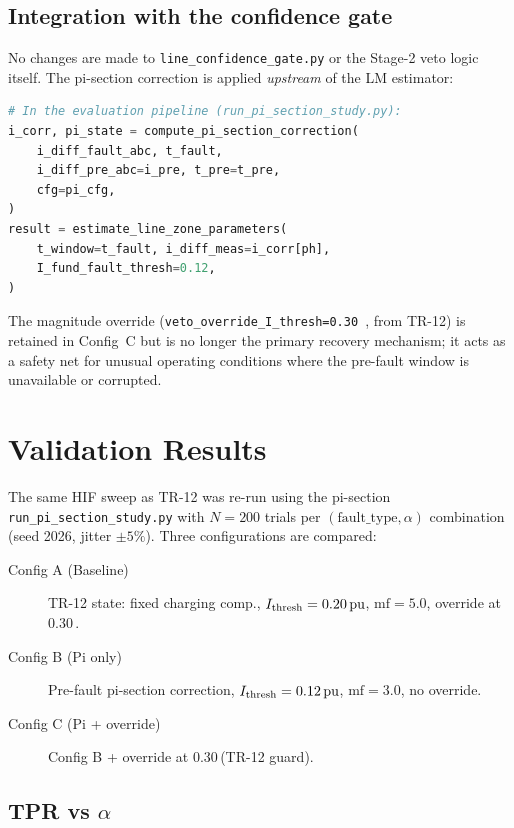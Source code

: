 \documentclass[11pt,a4paper]{article}
\newcommand{\pu}{\,\text{pu}}
\begin{document}
\subsection{Integration with the confidence gate}

No changes are made to \texttt{line\_confidence\_gate.py} or the Stage-2 veto
logic itself.  The pi-section correction is applied \emph{upstream} of the LM
estimator:

\begin{lstlisting}[language=Python]
# In the evaluation pipeline (run_pi_section_study.py):
i_corr, pi_state = compute_pi_section_correction(
    i_diff_fault_abc, t_fault,
    i_diff_pre_abc=i_pre, t_pre=t_pre,
    cfg=pi_cfg,
)
result = estimate_line_zone_parameters(
    t_window=t_fault, i_diff_meas=i_corr[ph],
    I_fund_fault_thresh=0.12,
)
\end{lstlisting}

The magnitude override (\texttt{veto\_override\_I\_thresh=0.30\pu}, from TR-12)
is retained in Config~C but is no longer the primary recovery mechanism; it
acts as a safety net for unusual operating conditions where the pre-fault window
is unavailable or corrupted.

\section{Validation Results}
\label{sec:results}

The same HIF sweep as TR-12 was re-run using the pi-section
\texttt{run\_pi\_section\_study.py} with $N = 200$ trials per
$(\mathrm{fault\_type}, \alpha)$ combination (seed 2026, jitter $\pm 5\%$).
Three configurations are compared:

\begin{description}
  \item[Config A (Baseline)] TR-12 state: fixed charging comp.,
        $I_{\rm thresh} = 0.20\pu$, $\mathrm{mf} = 5.0$, override at 0.30\pu.
  \item[Config B (Pi only)] Pre-fault pi-section correction,
        $I_{\rm thresh} = 0.12\pu$, $\mathrm{mf} = 3.0$, no override.
  \item[Config C (Pi + override)] Config B + override at 0.30\pu (TR-12 guard).
\end{description}

\subsection{TPR vs $\alpha$}
\end{document}
